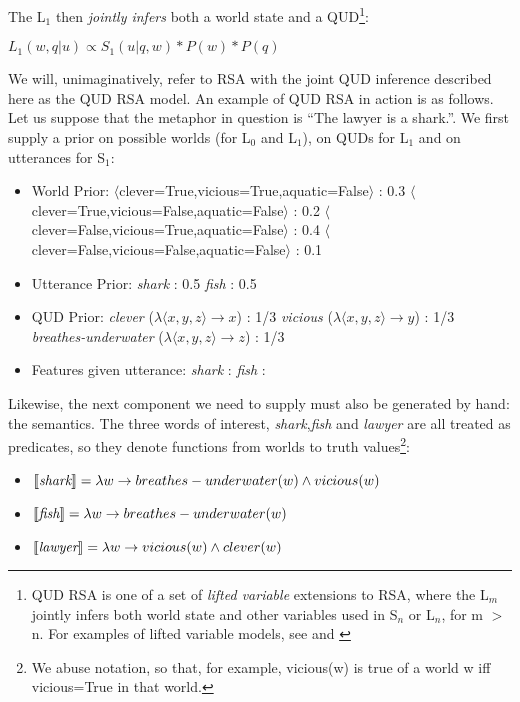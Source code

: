 \documentclass[10pt,letterpaper,twocolumn]{article}
\begin{document}
The L$_1$ then \emph{jointly infers} both a world state and a QUD\footnote{QUD RSA is one of a set of \emph{lifted variable} extensions to RSA, where the L$_m$ jointly infers both world state and other variables used in S$_n$ or L$_n$, for m $>$n. For examples of lifted variable models, see \cite{kao} and \cite{bergen}}:

\begin{exe}
\ex $L_1(w,q\vert u) \propto S_1(u\vert q,w)*P(w)*P(q)$
\end{exe}

We will, unimaginatively, refer to RSA with the joint QUD inference described here as the QUD RSA model. An example of QUD RSA in action is as follows. Let us suppose that the metaphor in question is ``The lawyer is a shark.''. We first supply a prior on possible worlds (for L$_0$ and L$_1$), on QUDs for L$_1$ and on utterances for S$_1$:

\begin{itemize}
\item World Prior: 
	\subitem $\langle$clever=True,vicious=True,aquatic=False$\rangle$ : 0.3
	\subitem $\langle$clever=True,vicious=False,aquatic=False$\rangle$ : 0.2
	\subitem $\langle$clever=False,vicious=True,aquatic=False$\rangle$ : 0.4
	\subitem $\langle$clever=False,vicious=False,aquatic=False$\rangle$ : 0.1
\item Utterance Prior:
	\subitem \emph{shark} : 0.5
	\subitem \emph{fish} : 0.5
\item QUD Prior:
	\subitem \emph{clever} ($\lambda \langle x,y,z\rangle \to x$) : 1/3
	\subitem \emph{vicious} ($\lambda \langle x,y,z\rangle \to y$) : 1/3
	\subitem \emph{breathes-underwater} ($\lambda \langle x,y,z\rangle \to z$) : 1/3
\item Features given utterance:
\subitem \emph{shark} : 
\subitem \emph{fish} :

\end{itemize}


Likewise, the next component we need to supply must also be generated by hand: the semantics. The three words of interest, \emph{shark},\emph{fish} and \emph{lawyer} are all treated as predicates, so they denote functions from worlds to truth values\footnote{We abuse notation, so that, for example, vicious(w) is true of a world w iff vicious=True in that world.}:

\begin{itemize}
\item $\llbracket \emph{shark} \rrbracket = \lambda w \to breathes-underwater(w) \wedge vicious(w)$
\item $\llbracket \emph{fish} \rrbracket = \lambda w \to breathes-underwater(w)$
\item $\llbracket \emph{lawyer} \rrbracket = \lambda w \to vicious(w) \wedge clever(w)$
\end{itemize}
\end{document}
